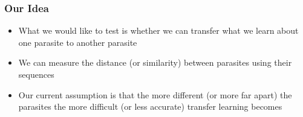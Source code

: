 \documentclass[compress]{beamer}
\begin{document}
\begin{frame}
\frametitle{Our Idea} 
\begin{itemize}%
 \item What we would like to test is whether we can transfer what we learn about one parasite to another parasite
 \item We can measure the distance (or similarity) between parasites using their sequences 
 \item Our current assumption is that the more different (or more far apart) the parasites the more difficult (or less accurate) transfer learning becomes
 
 \end{itemize}
\end{frame}

\end{document}
